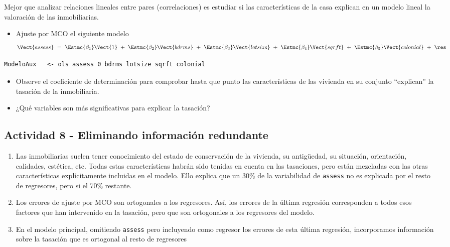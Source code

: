 \documentclass[11pt]{article}
\begin{document}
Mejor que analizar relaciones lineales entre pares (correlaciones) es
estudiar si las características de la casa explican en un modelo
lineal la valoración de las inmobiliarias. 
\begin{itemize}
\item Ajuste por MCO el siguiente modelo
\begin{displaymath}
  \Vect{assess}\ = \
       \Estmc{\beta_1}\Vect{1} 
  \ +\ \Estmc{\beta_2}\Vect{bdrms}
  \ +\ \Estmc{\beta_3}\Vect{lotsize}
  \ +\ \Estmc{\beta_4}\Vect{sqrft}
  \ +\ \Estmc{\beta_5}\Vect{colonial}
  \ +\ \res
\end{displaymath}
\end{itemize}

{\vspace{0pt} \color{gray!70!black}
\begin{verbatim}
ModeloAux   <- ols assess 0 bdrms lotsize sqrft colonial
\end{verbatim}
}

\begin{itemize}
\item Observe el coeficiente de determinación para comprobar hasta que
punto las características de las vivienda en su conjunto
``explican'' la tasación de la inmobiliaria.

\item ¿Qué variables son más significativas para explicar la tasación?
\end{itemize}

\subsection{Actividad 8 - Eliminando información redundante}
\label{sec:org39c6f7b}

\begin{enumerate}
\item Las inmobiliarias suelen tener conocimiento del estado de
conservación de la vivienda, su antigüedad, su situación,
orientación, calidades, estética, etc. Todas estas características
habrán sido tenidas en cuenta en las tasaciones, pero están
mezcladas con las otras características explícitamente incluidas en
el modelo. Ello explica que un 30\% de la variabilidad de \texttt{assess}
no es explicada por el resto de regresores, pero si el 70\%
restante.

\item Los errores de ajuste por MCO son ortogonales a los
regresores. Así, los errores de la última regresión corresponden a
todos esos factores que han intervenido en la tasación, pero que
son ortogonales a los regresores del modelo.

\item En el modelo principal, omitiendo \texttt{assess} pero incluyendo como
regresor los errores de esta última regresión, incorporamos
información sobre la tasación que es ortogonal al resto de
regresores
\end{enumerate}
\end{document}
